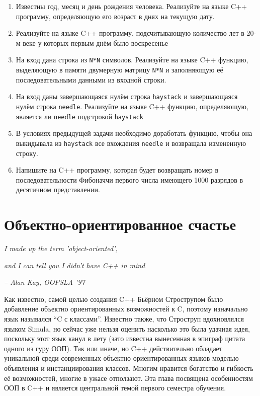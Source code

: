 \documentclass[a4paper,12pt,oneside]{article}
\begin{document}
\begin{enumerate}
\item
Известны год, месяц и день рождения человека. Реализуйте на языке C++ программу, определяющую его возраст в днях на текущую дату.

\item
Реализуйте на языке C++ программу, подсчитывающую количество лет в 20-м веке у которых первым днём было воскресенье

\item
На вход дана строка из \lstinline!N*N! символов. Реализуйте на языке C++ функцию, выделяющую в памяти двумерную матрицу \lstinline!N*N! и заполняющую её последовательными данными из входной строки.

\item
На вход даны завершающаяся нулём строка \lstinline!haystack! и завершающаяся нулём строка \lstinline!needle!. Реализуйте на языке C++ функцию, определяющую, является ли \lstinline!needle! подстрокой \lstinline!haystack!

\item
В условиях предыдущей задачи необходимо доработать функцию, чтобы она выкидывала из \lstinline!haystack! все вхождения \lstinline!needle! и возвращала измененную строку.

\item
Напишите на C++ программу, которая будет возвращать номер в последовательности Фибоначчи первого числа имеющего 1000 разрядов в десятичном представлении.

\end{enumerate}

\pagebreak
\section{Объектно-ориентированное счастье}

\hfill\textit{I made up the term 'object-oriented',}

\hfill\textit{and I can tell you I didn't have C++ in mind} {\vspace{0.5em}}

\hfill\textit{-- Alan Kay, OOPSLA '97}

Как известно, самой целью создания C++ Бьёрном Строструпом было добавление объектно ориентированных возможностей к C, поэтому изначально язык назывался ``C с классами''. Известно также, что Строструп вдохновлялся языком Simula, но сейчас уже нельзя оценить насколько это была удачная идея, поскольку этот язык канул в лету (зато известна вынесенная в эпиграф цитата одного из гуру ООП). Так или иначе, но C++ действительно обладает уникальной среди современных объектно ориентированных языков моделью объявления и инстанциирования классов. Многим нравится богатство и гибкость её возможностей, многие в ужасе отползают. Эта глава посвящена особенностям ООП в C++ и является центральной темой первого семестра обучения.
\end{document}

